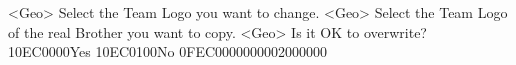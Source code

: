 <Geo> Select the Team Logo you want to change.
<Geo> Select the Team Logo of the real Brother you want to copy.
<Geo> Is it OK to overwrite? {10}{EC}{00}{00}Yes {10}{EC}{01}{00}No {0F}{EC}{00}{00}{00}{00}{02}{00}{00}{00}
